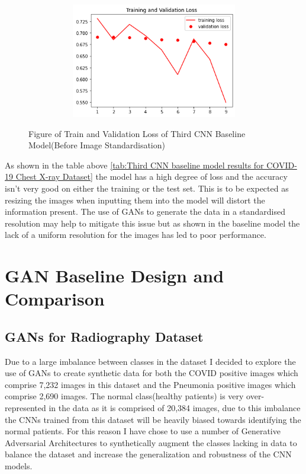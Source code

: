  \begin{figure}[H]
    \centering
    \includegraphics[width=1\textwidth,height=5cm,keepaspectratio]{Images/ThirdCNNBaselineTrainAndValLossBeforePreprocessing.png}\\
    \caption{Figure of Train and Validation Loss of Third CNN Baseline Model(Before Image Standardisation)}
    \label{fig:Third CNN Baseline Train and Validation Loss(before Pre-processing}
\end{figure}
As shown in the table above \ref{tab:Third CNN baseline model results for COVID-19 Chest X-ray Dataset} the model has a high degree of loss and the accuracy isn't very good on either the training or the test set.  This is to be expected as resizing the images when inputting them into the model will distort the information present.  The use of GANs to generate the data in a standardised resolution may help to mitigate this issue but as shown in the baseline model the lack of a uniform resolution for the images has led to poor performance.
\section{GAN Baseline Design and Comparison}
\subsection{GANs for Radiography Dataset}
Due to a large imbalance between classes in the dataset I decided to explore the use of GANs to create synthetic data for both the COVID positive images which comprise 7,232 images in this dataset and the Pneumonia positive images which comprise 2,690 images.  The normal class(healthy patients) is very over-represented in the data as it is comprised of 20,384 images, due to this imbalance the CNNs trained from this dataset will be heavily biased towards identifying the normal patients.  For this reason I have chose to use a number of Generative Adversarial Architectures to synthetically augment the classes lacking in data to balance the dataset and increase the generalization and robustness of the CNN models.
